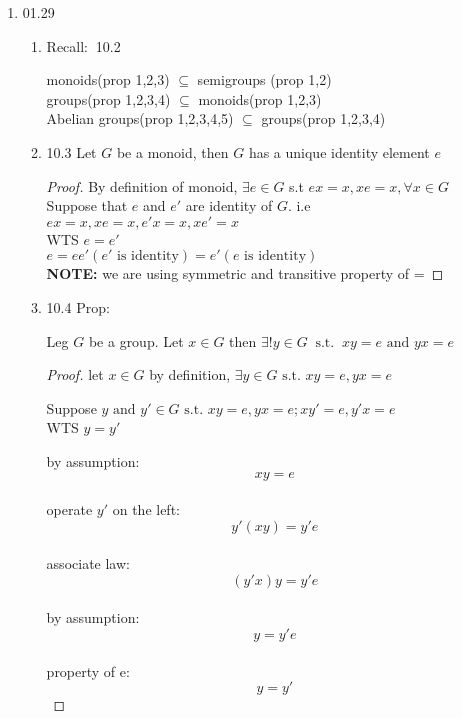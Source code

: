 \documentclass[12pt]{article}
\newcommand{\recall}{{\color{blue} Recall: $\ $}}
\newcommand{\prop}{{\color{blue} Prop: $\ $}}
\begin{document}
\begin{enumerate}
\begin{enumerate}
\begin{enumerate}
\begin{enumerate}
            \end{enumerate}

        \end{enumerate}
    \end{enumerate} 
    \item 01.29
    \begin{enumerate}
        \item \recall 10.2
        
        monoids(prop 1,2,3) $\subseteq$ semigroups (prop 1,2) \\
        groups(prop 1,2,3,4) $\subseteq$ monoids(prop 1,2,3) \\
        Abelian groups(prop 1,2,3,4,5) $\subseteq$ groups(prop 1,2,3,4) \\

        \item 10.3 Let $G$ be a monoid, then $G$ has a unique identity element $e$
        \begin{proof}
            By definition of monoid, $\exists e \in G$ s.t $ex = x, xe = x, \forall x \in G$\\
            Suppose that $e$ and $e'$ are identity of $G$. i.e $ex = x, xe = x, e'x = x, xe' = x$\\
            WTS $e = e'$\\
            $e = e e' (e' \text{ is identity}) = e' (e \text{ is identity})$\\
            \textbf{NOTE:} we are using symmetric and transitive property of =
        \end{proof}

        \item 10.4 \prop 
        
        Leg $G$ be a group. Let $x \in G$ then $\exists ! y \in G \ \text{ s.t. } \ xy = e \text{ and } yx = e$

        \begin{proof}
            let $x \in G$ by definition, $\exists y \in G \text{ s.t. } xy = e, yx = e$

            Suppose $y \text{ and } y' \in G \text{ s.t. } xy = e, yx = e; xy' = e, y'x = e$\\
            WTS $y = y'$

            by assumption: $$xy = e$$\\
            operate $y'$ on the left: $$y'(xy) = y'e$$\\
            associate law: $$(y'x)y = y'e$$\\
            by assumption:$$y = y'e$$\\
            property of e:$$y = y'$$


\end{proof}
\end{enumerate}
\end{enumerate}
\end{document}
